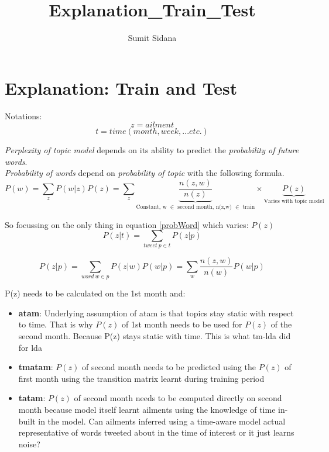 \documentclass{article}
\begin{document}
\title{Explanation\_Train\_Test}
\author{Sumit Sidana}
\maketitle
{}
\date{}
\section{Explanation: Train and Test}
Notations:
\begin{equation}
z = ailment
\end{equation}
\begin{equation}
t = time (month, week,... etc.)
\end{equation}


\textit{Perplexity of topic model} depends on its ability to predict the \textit{probability of future words}.\\
\textit{Probability of words} depend on \textit{probability of topic} with the following formula.
\begin{equation}\label{probWord}
P(w) = \sum_zP(w|z)P(z)=\sum_z\underbrace{\frac{n(z,w)}{n(z)}}_	{\mbox{Constant, w $\in$ second month, n(z,w) $\in$ train}}\times \underbrace{P(z)}_{\mbox{Varies with topic model}}
\end{equation}

So focussing on the only thing in equation \ref{probWord} which varies: $P(z)$\\
\begin{equation}
P(z|t) = \sum_{tweet\ p \in t}P(z|p)
\end{equation}

\begin{equation}
P(z|p) = 	\sum_{word\ w \in p}P(z|w)P(w|p)=\sum_w\frac{n(z,w)}{n(w)}P(w|p)
\end{equation}

P(z) needs to be calculated on the 1st month and:
\begin{itemize}
\item \textbf{atam}: Underlying assumption of atam is that topics stay static with respect to time. That is why $P(z)$ of 1st month needs to be used for $P(z)$ of the second month. Because P(z) stays static with time. This is what tm-lda did for lda
\item \textbf{tmatam}:  $P(z)$ of second month needs to be predicted using the $P(z)$ of first month using the transition matrix learnt during training period
\item \textbf{tatam}: $P(z)$ of second month needs to be computed directly on second month because model itself learnt ailments using the knowledge of time in-built in the model. Can ailments inferred using a time-aware model  actual representative of words tweeted about in the time of interest or it just learns noise?
\end{itemize}
\end{document}
